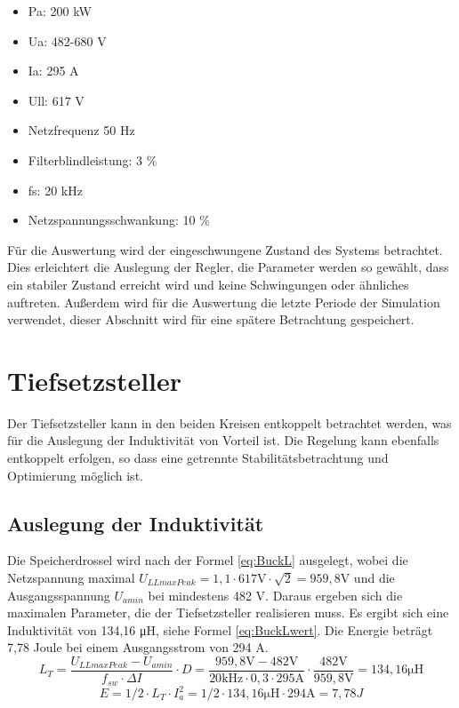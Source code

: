 \begin{itemize}
\item \gls{Pa}: 200 kW
\item \gls{Ua}: 482-680 V
\item \gls{Ia}: 	295 A
\item \gls{Ull}:		617 V
\item Netzfrequenz		50 Hz
\item Filterblindleistung: 3 \%
\item \gls{fs}: 20 kHz
\item Netzspannungsschwankung: 10 \%
\end{itemize}

Für die Auswertung wird der eingeschwungene Zustand des Systems betrachtet. Dies erleichtert die Auslegung der Regler, die Parameter werden so gewählt, dass ein stabiler Zustand erreicht wird und keine Schwingungen oder ähnliches auftreten. Außerdem wird für die Auswertung die letzte Periode der Simulation verwendet, dieser Abschnitt wird für eine spätere Betrachtung gespeichert.

\section{Tiefsetzsteller}
Der Tiefsetzsteller kann in den beiden Kreisen entkoppelt betrachtet werden, was für die Auslegung der Induktivität von Vorteil ist. Die Regelung kann ebenfalls entkoppelt erfolgen, so dass eine getrennte Stabilitätsbetrachtung und Optimierung möglich ist. 
	\subsection{Auslegung der Induktivität}
	Die Speicherdrossel wird nach der Formel \ref{eq:BuckL} ausgelegt, wobei die Netzspannung maximal $U_{LLmaxPeak}=1,1 \cdot 617 \si{\V} \cdot \sqrt{2}=959,8 \si{\V}$ und die Ausgangsspannung $U_{amin}$ bei mindestens 482 \si{\V}. Daraus ergeben sich die maximalen Parameter, die der Tiefsetzsteller realisieren muss. Es ergibt sich eine Induktivität von 134,16 \si{\micro \henry}, siehe Formel \ref{eq:BuckLwert}. Die Energie beträgt 7,78 Joule bei einem Ausgangsstrom von 294 A. 
	\begin{equation}
	\label{eq:BuckLwert}
	L_{T}= \dfrac{U_{LLmaxPeak}-U_{amin}}{f_{sw} \cdot \Delta I} \cdot D = \dfrac{959,8\si{\V} - 482 \si{\V}}{20 \si{\kilo \hertz}\cdot 0,3 \cdot 295 \si{\ampere}} \cdot \dfrac{482 \si{\V}}{959,8 \si{\V}}= 134,16 \si{\micro \henry} 
	\end{equation}
	\begin{equation}
		E=1/2 \cdot L_{T} \cdot I_{a}^{2} = 1/2 \cdot 134,16 \si{\micro \henry}  \cdot 294 \si{\ampere} = 7,78 J
	\end{equation}
